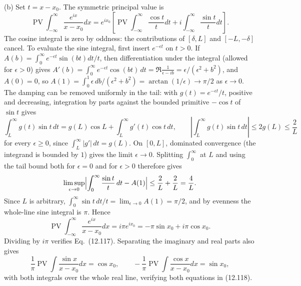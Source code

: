 (b) Set $t=x-x_0$. The symmetric principal value is
\[
\operatorname{PV}\int_{-\infty}^{\infty}\frac{e^{ix}}{x-x_0}dx
=e^{ix_0}\left[\operatorname{PV}\int_{-\infty}^{\infty}
\frac{\cos t}{t}dt+i\int_{-\infty}^{\infty}\frac{\sin t}{t}dt\right].
\]
The cosine integral is zero by oddness: the contributions of $[\delta,L]$
and $[-L,-\delta]$ cancel. To evaluate the sine integral,
first insert $e^{-\epsilon t}$ on $t>0$. If
$A(b)=\int_0^\infty e^{-\epsilon t}\sin(bt)dt/t$, then differentiation
under the integral (allowed for $\epsilon>0$) gives
$A'(b)=\int_0^\infty e^{-\epsilon t}\cos(bt)\,dt
=\Re\frac1{\epsilon-ib}=\epsilon/(\epsilon^2+b^2)$, and $A(0)=0$, so
$A(1)=\int_0^1\epsilon\,db/(\epsilon^2+b^2)=\arctan(1/\epsilon)\to\pi/2$
as $\epsilon\to0$.
The damping can be removed uniformly in the tail: with
$g(t)=e^{-\epsilon t}/t$, positive and decreasing, integration by parts
against the bounded primitive $-\cos t$ of $\sin t$ gives
\[
\int_L^\infty g(t)\sin t\,dt=g(L)\cos L+\int_L^\infty g'(t)\cos t\,dt,
\qquad
\left|\int_L^\infty g(t)\sin t\,dt\right|\le2g(L)\le\frac2L
\]
for every $\epsilon\ge0$, since $\int_L^\infty|g'|\,dt=g(L)$. On
$[0,L]$, dominated convergence (the integrand is bounded by $1$) gives
the limit $\epsilon\to0$. Splitting $\int_0^\infty$ at $L$ and using the
tail bound both for $\epsilon=0$ and for $\epsilon>0$ therefore gives
\[
\limsup_{\epsilon\to0}\Bigl|\int_0^\infty\frac{\sin t}{t}\,dt-A(1)\Bigr|
\le\frac2L+\frac2L=\frac4L.
\]
Since $L$ is arbitrary,
$\int_0^\infty\sin t\,dt/t=\lim_{\epsilon\to0}A(1)=\pi/2$,
and by evenness the whole-line sine integral is $\pi$. Hence
\[
\operatorname{PV}\int_{-\infty}^{\infty}\frac{e^{ix}}{x-x_0}dx
=i\pi e^{ix_0}=-\pi\sin x_0+i\pi\cos x_0.
\]
Dividing by $i\pi$ verifies Eq.~(12.117). Separating the imaginary and
real parts also gives
\[
\frac1\pi\operatorname{PV}\int\frac{\sin x}{x-x_0}dx=\cos x_0,\qquad
-\frac1\pi\operatorname{PV}\int\frac{\cos x}{x-x_0}dx=\sin x_0,
\]
with both integrals over the whole real line, verifying both equations
in (12.118).

